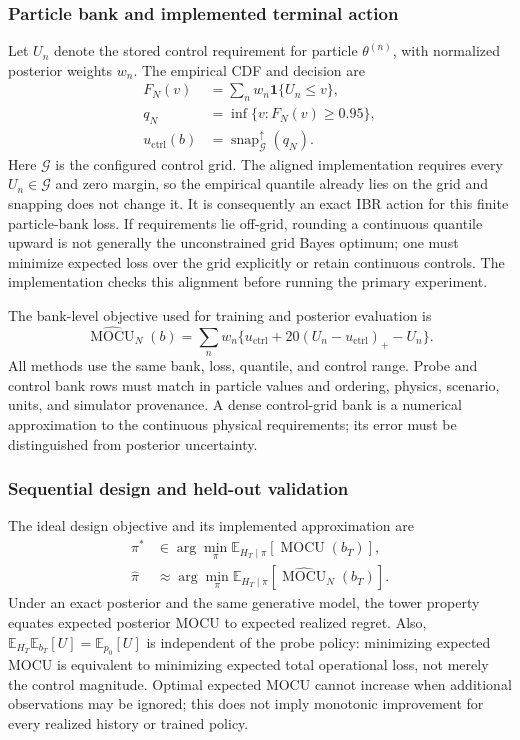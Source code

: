 \subsubsection{Particle bank and implemented terminal action}
Let $U_n$ denote the stored control requirement for particle $\theta^{(n)}$,
with normalized posterior weights $w_n$. The empirical CDF and decision are
\begin{align}
F_N(v)&=\sum_n w_n\mathbf1\{U_n\le v\},\\
q_N&=\inf\{v:F_N(v)\ge0.95\},\\
u_{\mathrm{ctrl}}(b)&=\operatorname{snap}_{\mathcal G}^{\uparrow}(q_N).
\label{eq:u_ctrl}
\end{align}
Here $\mathcal G$ is the configured control grid. The aligned implementation
requires every $U_n\in\mathcal G$ and zero margin, so the empirical quantile
already lies on the grid and snapping does not change it. It is consequently
an exact IBR action for this finite particle-bank loss. If requirements lie
off-grid, rounding a continuous quantile upward is not generally the
unconstrained grid Bayes optimum; one must minimize expected loss over the
grid explicitly or retain continuous controls. The implementation checks
this alignment before running the primary experiment.

The bank-level objective used for training and posterior evaluation is
\begin{equation}
\widehat{\operatorname{MOCU}}_N(b)
=\sum_n w_n\{u_{\mathrm{ctrl}}+20(U_n-u_{\mathrm{ctrl}})_+-U_n\}.
\label{eq:particle_mocu}
\end{equation}
All methods use the same bank, loss, quantile, and control range. Probe and
control bank rows must match in particle values and ordering, physics,
scenario, units, and simulator provenance. A dense control-grid bank is a
numerical approximation to the continuous physical requirements; its error
must be distinguished from posterior uncertainty.

\subsubsection{Sequential design and held-out validation}
The ideal design objective and its implemented approximation are
\begin{align}
\pi^*&\in\arg\min_\pi\mathbb E_{H_T\mid\pi}
[\operatorname{MOCU}(b_T)],\\
\widehat\pi&\approx\arg\min_\pi\mathbb E_{H_T\mid\pi}
[\widehat{\operatorname{MOCU}}_N(b_T)].
\label{eq:mocu_policy}
\end{align}
Under an exact posterior and the same generative model, the tower property
equates expected posterior MOCU to expected realized regret. Also,
$\mathbb E_{H_T}\mathbb E_{b_T}[U]=\mathbb E_{p_0}[U]$ is independent of the
probe policy: minimizing expected MOCU is equivalent to minimizing expected
total operational loss, not merely the control magnitude. Optimal expected
MOCU cannot increase when additional observations may be ignored; this does
not imply monotonic improvement for every realized history or trained policy.

